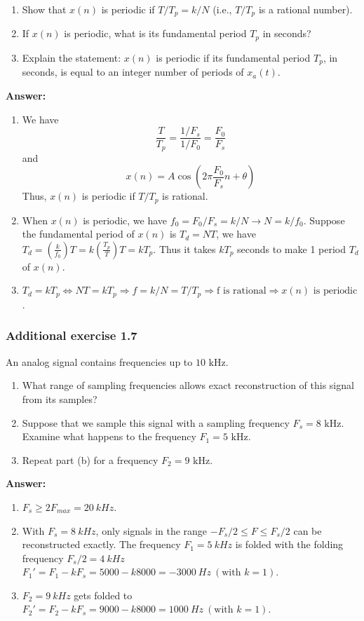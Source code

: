 \documentclass[12pt,a4paper]{article}
\begin{document}
\begin{enumerate}[label=\textbf{(\alph*)}, leftmargin=*]
    \item Show that $x(n)$ is periodic if $T/T_p = k/N$ (i.e., $T/T_p$ is a rational number).
    \item If $x(n)$ is periodic, what is its fundamental period $T_p$ in seconds?
    \item Explain the statement: $x(n)$ is periodic if its fundamental period $T_p$, in seconds, is equal to an integer number of periods of $x_a(t)$.
\end{enumerate}

\noindent\textbf{Answer:}
\begin{enumerate}[label=\textbf{(\alph*)}, leftmargin=*]
    \item We have
    \[\frac{T}{T_p}=\frac{1/F_s}{1/F_0}=\frac{F_0}{F_s}\]
    and
    \[x(n)=A\cos(2\pi\frac{F_0}{F_s}n+\theta)\]
    Thus, $x(n)$ is periodic if $T/T_p$ is rational.
    \item When $x(n)$ is periodic, we have $f_0 = F_0/F_s = k/N \rightarrow N = k/f_0$.
    Suppose the fundamental period of $x(n)$ is $T_d=NT$, we have $T_d = (\frac{k}{f_0})T = k(\frac{T_p}{T})T = kT_p$.
    Thus it takes $kT_p$ seconds to make 1 period $T_d$ of $x(n)$.
    \item $T_d = kT_p \Leftrightarrow NT = kT_p \Rightarrow f = k/N = T/T_p \Rightarrow \text{f is rational}\Rightarrow \text{$x(n)$ is periodic}$.
\end{enumerate}
\subsubsection*{Additional exercise 1.7}
\noindent
An analog signal contains frequencies up to $10\text{ kHz}$.

\begin{enumerate}[label=\textbf{(\alph*)}, leftmargin=*]
    \item What range of sampling frequencies allows exact reconstruction of this signal from its samples?
    \item Suppose that we sample this signal with a sampling frequency $F_s = 8\text{ kHz}$. Examine what happens to the frequency $F_1 = 5\text{ kHz}$.
    \item Repeat part (b) for a frequency $F_2 = 9\text{ kHz}$.
\end{enumerate}

\noindent\textbf{Answer:}
\begin{enumerate}[label=\textbf{(\alph*)}, leftmargin=*]
    \item $F_s\geq 2F_{max} = 20\: kHz$.
    \item With $F_s = 8\: kHz$, only signals in the range $-F_s/2\leq F \leq F_s/2$ can be reconstructed exactly.
    The frequency $F_1=5\: kHz$ is folded with the folding frequency $F_s/2 = 4\: kHz$ $F_1'=F_1-kF_s = 5000 - k8000 = -3000\: Hz\:(\text{with $k=1$})$.
    \item $F_2 = 9\: kHz$ gets folded to $F_2' = F_2 - kF_s=9000-k8000= 1000\: Hz\: (\text{with $k=1$})$.
\end{enumerate}
\end{document}
